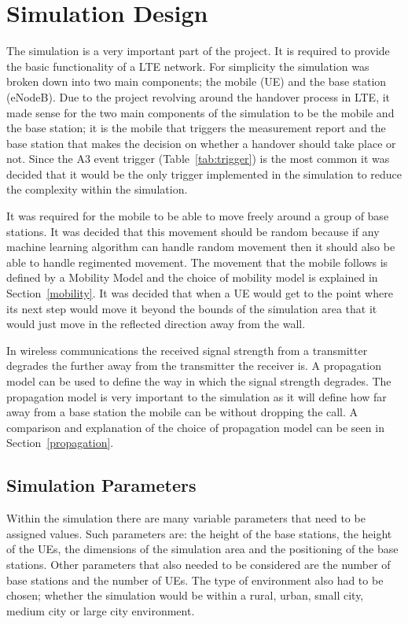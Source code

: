 \chapter{Simulation Design}
The simulation is a very important part of the project. It is required to provide the basic functionality of a LTE network. For simplicity the simulation was broken down into two main components; the mobile (UE) and the base station (eNodeB). Due to the project revolving around the handover process in LTE, it made sense for the two main components of the simulation to be the mobile and the base station; it is the mobile that triggers the measurement report and the base station that makes the decision on whether a handover should take place or not. Since the A3 event trigger (Table~\ref{tab:trigger}) is the most common it was decided that it would be the only trigger implemented in the simulation to reduce the complexity within the simulation.

It was required for the mobile to be able to move freely around a group of base stations. It was decided that this movement should be random because if any machine learning algorithm can handle random movement then it should also be able to handle regimented movement. The movement that the mobile follows is defined by a Mobility Model and the choice of mobility model is explained in Section~\ref{mobility}. It was decided that when a UE would get to the point where its next step would move it beyond the bounds of the simulation area that it would just move in the reflected direction away from the wall.

In wireless communications the received signal strength from a transmitter degrades the further away from the transmitter the receiver is. A propagation model can be used to define the way in which the signal strength degrades. The propagation model is very important to the simulation as it will define how far away from a base station the mobile can be without dropping the call. A comparison and explanation of the choice of propagation model can be seen in Section~\ref{propagation}.
\section{Simulation Parameters}
Within the simulation there are many variable parameters that need to be assigned values. Such parameters are: the height of the base stations, the height of the UEs, the dimensions of the simulation area and the positioning of the base stations. Other parameters that also needed to be considered are the number of base stations and the number of UEs. The type of environment also had to be chosen; whether the simulation would be within a rural, urban, small city, medium city or large city environment.

